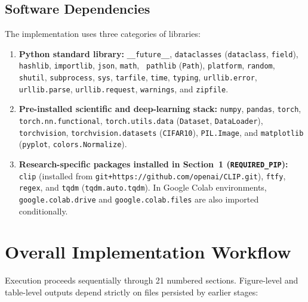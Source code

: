 \documentclass[11pt,a4paper]{article}
\begin{document}
\subsection{Software Dependencies}
The implementation uses three categories of libraries:
\begin{enumerate}
  \item \textbf{Python standard library:} \texttt{\_\allowbreak{}\_\allowbreak{}future\_\allowbreak{}\_\allowbreak{}}, \texttt{dataclasses} (\texttt{dataclass}, \texttt{field}), \texttt{hashlib}, \texttt{importlib}, \texttt{json}, \texttt{math}, \texttt{ pathlib} (\texttt{Path}), \texttt{platform}, \texttt{random}, \texttt{shutil}, \texttt{subprocess}, \texttt{sys}, \texttt{tarfile}, \texttt{time}, \texttt{typing}, \texttt{urllib.error}, \texttt{urllib.parse}, \texttt{urllib.request}, \texttt{warnings}, and \texttt{zipfile}.
  \item \textbf{Pre-installed scientific and deep-learning stack:} \texttt{numpy}, \texttt{pandas}, \texttt{torch}, \texttt{torch.nn.functional}, \texttt{torch.utils.data} (\texttt{Dataset}, \texttt{DataLoader}), \texttt{torchvision}, \texttt{torchvision.datasets} (\texttt{CIFAR10}), \texttt{PIL.Image}, and \texttt{matplotlib} (\texttt{pyplot}, \texttt{colors.Normalize}).
  \item \textbf{Research-specific packages installed in Section~1 (\texttt{REQUIRED\_\allowbreak{}PIP}):} \texttt{clip} (installed from \texttt{git+https:/\allowbreak{}/\allowbreak{}github.com/\allowbreak{}openai/\allowbreak{}CLIP.git}), \texttt{ftfy}, \texttt{regex}, and \texttt{tqdm} (\texttt{tqdm.auto.tqdm}). In Google Colab environments, \texttt{google.colab.drive} and \texttt{google.colab.files} are also imported conditionally.
\end{enumerate}

\section{Overall Implementation Workflow}
\label{sec:workflow}

Execution proceeds sequentially through 21 numbered sections. Figure-level and table-level outputs depend strictly on files persisted by earlier stages:
\end{document}
